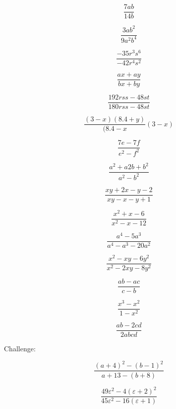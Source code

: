 \begin{bbwAufgabenBlock}
\item $$\frac{7ab}{14b}$$

\item $$\frac{3ab^2}{9a^2b^4}$$

\item $$\frac{-35r^3s^6}{-42r^4s^2}$$

\item $$\frac{ax+ay}{bx+by}$$

\item $$\frac{192rss-48st}{180rss-48st}$$

\item $$\frac{(3-x)(8.4+y)}{(8.4-x}(3-x)$$

\item $$\frac{7e-7f}{e^2-f^2}$$

\item $$\frac{a^2+a2b+b^2}{a^2-b^2}$$

\item $$\frac{xy+2x-y-2}{xy-x-y+1}$$

\item $$\frac{x^2+x-6}{x^2-x-12}$$

\item $$\frac{a^4-5a^3}{a^4-a^3-20a^2}$$

\item $$\frac{x^2-xy-6y^2}{x^2-2xy-8y^2}$$

\item $$\frac{ab-ac}{c-b}$$

\item $$\frac{x^3-x^2}{1-x^2}$$

\item $$\frac{ab-2cd}{2abcd}$$

\vspace{3mm}
Challenge:

\item $$\frac{(a+4)^2-(b-1)^2}{a+13-(b+8)}$$


\item $$\frac{49\varepsilon^2 - 4(\varepsilon+2)^2}{45\varepsilon^2 - 16(\varepsilon+1)}$$


\end{bbwAufgabenBlock}
\newpage
